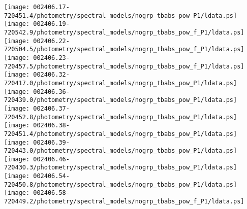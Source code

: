 \documentclass{aastex}
\begin{document}
\begin{figure*}[!ht]
\centering
\texttt{[image: 002406.17-720451.4/photometry/spectral\_models/nogrp\_tbabs\_pow\_P1/ldata.ps]} \hfill 
\texttt{[image: 002406.19-720542.9/photometry/spectral\_models/nogrp\_tbabs\_pow\_f\_P1/ldata.ps]} \hfill 
\texttt{[image: 002406.22-720504.5/photometry/spectral\_models/nogrp\_tbabs\_pow\_f\_P1/ldata.ps]} \\ 
\vspace*{0.5in}
\texttt{[image: 002406.23-720457.5/photometry/spectral\_models/nogrp\_tbabs\_pow\_f\_P1/ldata.ps]} \hfill 
\texttt{[image: 002406.32-720417.0/photometry/spectral\_models/nogrp\_tbabs\_pow\_P1/ldata.ps]} \hfill 
\texttt{[image: 002406.36-720439.0/photometry/spectral\_models/nogrp\_tbabs\_pow\_P1/ldata.ps]} \\ 
\vspace*{0.5in}
\texttt{[image: 002406.37-720452.8/photometry/spectral\_models/nogrp\_tbabs\_pow\_P1/ldata.ps]} \hfill 
\texttt{[image: 002406.38-720451.4/photometry/spectral\_models/nogrp\_tbabs\_pow\_P1/ldata.ps]} \hfill 
\texttt{[image: 002406.39-720443.0/photometry/spectral\_models/nogrp\_tbabs\_pow\_P1/ldata.ps]} \\ 
\vspace*{0.5in}
\texttt{[image: 002406.46-720430.3/photometry/spectral\_models/nogrp\_tbabs\_pow\_P1/ldata.ps]} \hfill 
\texttt{[image: 002406.54-720450.8/photometry/spectral\_models/nogrp\_tbabs\_pow\_P1/ldata.ps]} \hfill 
\texttt{[image: 002406.58-720449.2/photometry/spectral\_models/nogrp\_tbabs\_pow\_f\_P1/ldata.ps]} \\ 
\vspace*{0.5in}
\end{figure*}
\clearpage
\end{document}
